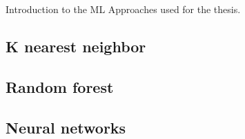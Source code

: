 Introduction to the ML Approaches used for the thesis.

\subsection{K nearest neighbor}
\subsection{Random forest}
\subsection{Neural networks}